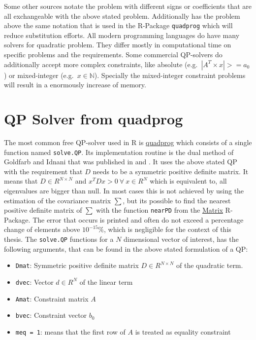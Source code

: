 \documentclass[
  oneside]{book}
\providecommand{\tightlist}{%
  \setlength{\itemsep}{0pt}\setlength{\parskip}{0pt}}
\begin{document}
Some other sources notate the problem with different signs or coefficients that are all exchangeable with the above stated problem. Additionally has the problem above the same notation that is used in the R-Package \texttt{quadprog} which will reduce substitution efforts. All modern programming languages do have many solvers for quadratic problem. They differ mostly in computational time on specific problems and the requirements. Some commercial QP-solvers do additionally accept more complex constraints, like absolute (e.g.~\(|A^T \times x| >= a_0\)) or mixed-integer (e.g.~\(x \in \mathbb{N}\)). Specially the mixed-integer constraint problems will result in a enormously increase of memory.

\hypertarget{qp-solver-from-quadprog}{%
\section{QP Solver from quadprog}\label{qp-solver-from-quadprog}}

The most common free QP-solver used in R is \href{https://cran.r-project.org/web/packages/quadprog/quadprog.pdf}{quadprog} which consists of a single function named \texttt{solve.QP}. Its implementation routine is the dual method of Goldfarb and Idnani that was published in \citep{GoId1982} and \citep{GoId1983}. It uses the above stated QP with the requirement that \(D\) needs to be a symmetric positive definite matrix. It means that \(D\in R^{N \times N}\) and \(x^T D x > 0 \ \forall \ x \in R^N\) which is equivalent to, all eigenvalues are bigger than null. In most cases this is not achieved by using the estimation of the covariance matrix \(\sum\), but its possible to find the nearest positive definite matrix of \(\textstyle\sum\) with the function \texttt{nearPD} from the \href{https://cran.r-project.org/web/packages/Matrix/Matrix.pdf}{Matrix} R-Package. The error that occurs is printed and often do not exceed a percentage change of elements above \(10^{-15} \%\), which is negligible for the context of this thesis. The \texttt{solve.QP} functions for a \(N\) dimensional vector of interest, has the following arguments, that can be found in the above stated formulation of a QP:

\begin{itemize}
\tightlist
\item
  \texttt{Dmat}: Symmetric positive definite matrix \(D \in R^{N \times N}\) of the quadratic term.
\item
  \texttt{dvec}: Vector \(d \in R^{N}\) of the linear term
\item
  \texttt{Amat}: Constraint matrix \(A\)
\item
  \texttt{bvec}: Constraint vector \(b_0\)
\item
  \texttt{meq\ =\ 1}: means that the first row of \(A\) is treated as equality constraint
\end{itemize}
\end{document}
